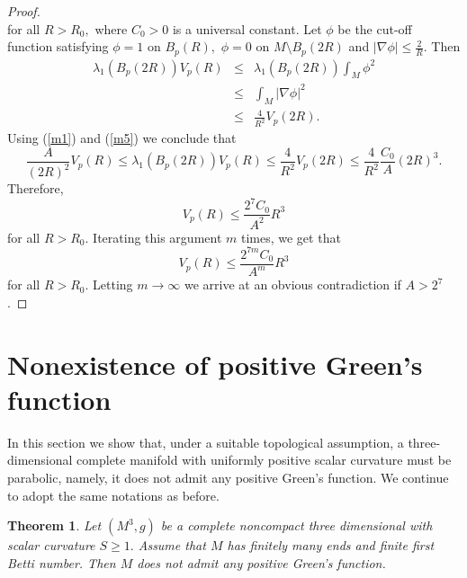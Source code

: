 \documentclass{amsart}
\newtheorem{theorem}{Theorem}[section]
\numberwithin{equation}{section}
\begin{document}
\begin{proof}
\begin{equation}
\end{equation}%
for all $R>R_{0},$ where $C_{0}>0$ is a universal constant. Let $\phi$ be 
the cut-off function satisfying $\phi =1$ on $B_{p}\left( R\right),$ $\phi =0$
on $M\setminus B_{p}\left( 2R\right) $ and $\left\vert \nabla \phi
\right\vert \leq \frac{2}{R}.$ Then
\begin{eqnarray*}
\lambda _{1}\left( B_{p}\left( 2R\right) \right) V_{p}\left( R\right)  &\leq
&\lambda _{1}\left( B_{p}\left( 2R\right) \right) \int_{M}\phi ^{2} \\
&\leq &\int_{M}\left\vert \nabla \phi \right\vert ^{2} \\
&\leq &\frac{4}{R^{2}}V_{p}\left( 2R\right).
\end{eqnarray*}%
Using (\ref{m1}) and (\ref{m5}) we conclude that 
\begin{equation*}
\frac{A}{(2R)^{2}}V_{p}\left( R\right) \leq \lambda _{1}\left( B_{p}\left(
2R\right) \right) V_{p}\left( R\right) \leq \frac{4}{R^{2}}V_{p}\left(
2R\right) \leq \frac{4}{R^{2}}\frac{C_{0}}{A}\left( 2R\right) ^{3}.
\end{equation*}%
Therefore,
\begin{equation*}
V_{p}\left( R\right) \leq \frac{2^7 C_{0}}{A^{2}}R^{3}
\end{equation*}%
for all $R>R_{0}.$ Iterating this argument $m$ times, we get
that 
\begin{equation*}
V_{p}\left( R\right) \leq \frac{2^{7m}C_{0}}{A^{m}}R^{3}
\end{equation*}%
for all $R>R_{0}.$ Letting $m\rightarrow \infty $ we arrive at an obvious contradiction if $A>2^7$.
\end{proof}

\section{Nonexistence of positive Green's function}

In this section we show that, under a suitable topological assumption, a three-dimensional complete manifold
with uniformly positive scalar curvature must be parabolic, namely, it does not admit
any positive Green's function. We continue to adopt the same notations as before.

\begin{theorem}
Let $\left( M^{3},g\right) $ be a complete noncompact three dimensional with
scalar curvature $S\geq 1.$ Assume that $M$ has finitely many ends and
finite first Betti number. Then $M$ does not admit any positive Green's function. 
\end{theorem}
\end{document}
